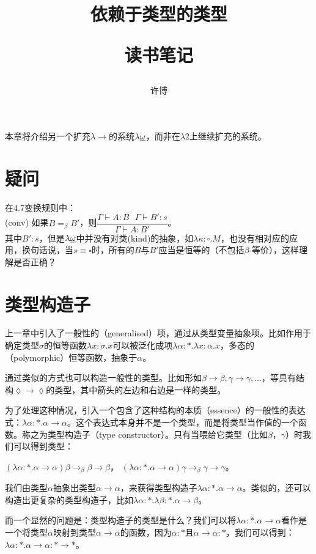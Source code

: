 \documentclass[UTF8]{article}
\title{依赖于类型的类型\\[2ex]\begin{large}读书笔记\end{large}}
\author{许博}
\date{}
\begin{document}
\maketitle
		\noindent
		本章将介绍另一个扩充$\lambda{\rightarrow}$的系统$\lambda{\uline{\omega}}$，而非在$\lambda{2}$上继续扩充的系统。
		
	\section{疑问}
		在4.7变换规则中：\\
		
		(conv) 如果$B=_\beta B'$，则$\dfrac{\Gamma\vdash A:B\ \ \ \Gamma\vdash B':s}{\Gamma\vdash A:B'}$。\\
		
		其中$B':s$，但是$\lambda{\uline{\omega}}$中并没有对类(kind)的抽象，如$\lambda\kappa:\square.M$，也没有相对应的应用，换句话说，当$s\equiv\square$时，所有的$B$与$B'$应当是恒等的（不包括$\beta$-等价），这样理解是否正确？

	\section{类型构造子}
		\noindent
		上一章中引入了一般性的（generalised）项，通过从类型变量抽象项。比如作用于确定类型$\sigma$的恒等函数$\lambda x:\sigma.x$可以被泛化成项$\lambda\alpha:*.\lambda x:\alpha.x$，多态的（polymorphic）恒等函数，抽象于$\alpha$。
		
		通过类似的方式也可以构造一般性的类型。比如形如$\beta\rightarrow\beta,\gamma\rightarrow\gamma,...$，等具有结构$\lozenge\rightarrow\lozenge$的类型，其中箭头的左边和右边是一样的类型。
		
		为了处理这种情况，引入一个包含了这种结构的本质（essence）的一般性的表达式：$\lambda\alpha:*.\alpha\rightarrow\alpha$。这个表达式本身并不是一个类型，而是将类型当作值的一个函数。称之为类型构造子（type constructor）。只有当喂给它类型（比如$\beta$，$\gamma$）时我们可以得到类型：
		
		$(\lambda\alpha:*.\alpha\rightarrow\alpha)\beta\rightarrow_\beta\beta\rightarrow\beta$，
		$(\lambda\alpha:*.\alpha\rightarrow\alpha)\gamma\rightarrow_\beta\gamma\rightarrow\gamma$。
		
		我们由类型$\alpha$抽象出类型$\alpha\rightarrow\alpha$，来获得类型构造子$\lambda\alpha:*.\alpha\rightarrow\alpha$。类似的，还可以构造出更复杂的类型构造子，比如$\lambda\alpha:*.\lambda\beta:*.\alpha\rightarrow\beta$。
		
		而一个显然的问题是：类型构造子的类型是什么？我们可以将$\lambda\alpha:*.\alpha\rightarrow\alpha$看作是一个将类型$\alpha$映射到类型$\alpha\rightarrow\alpha$的函数，因为$\alpha:*$且$\alpha\rightarrow\alpha:*$，我们可以得到：$\lambda\alpha:*.\alpha\rightarrow\alpha:*\rightarrow*$。
		
\end{document}
